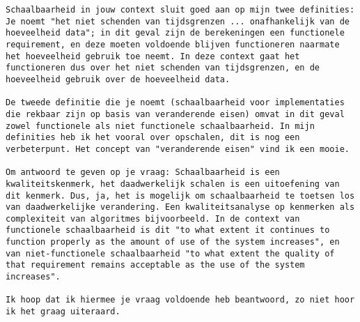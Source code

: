 \begin{verbatim}
Schaalbaarheid in jouw context sluit goed aan op mijn twee definities: Je noemt "het niet schenden van tijdsgrenzen ... onafhankelijk van de hoeveelheid data"; in dit geval zijn de berekeningen een functionele requirement, en deze moeten voldoende blijven functioneren naarmate het hoeveelheid gebruik toe neemt. In deze context gaat het functioneren dus over het niet schenden van tijdsgrenzen, en de hoeveelheid gebruik over de hoeveelheid data.

De tweede definitie die je noemt (schaalbaarheid voor implementaties die rekbaar zijn op basis van veranderende eisen) omvat in dit geval zowel functionele als niet functionele schaalbaarheid. In mijn definities heb ik het vooral over opschalen, dit is nog een verbeterpunt. Het concept van "veranderende eisen" vind ik een mooie.

Om antwoord te geven op je vraag: Schaalbaarheid is een kwaliteitskenmerk, het daadwerkelijk schalen is een uitoefening van dit kenmerk. Dus, ja, het is mogelijk om schaalbaarheid te toetsen los van daadwerkelijke verandering. Een kwaliteitsanalyse op kenmerken als complexiteit van algoritmes bijvoorbeeld. In de context van functionele schaalbaarheid is dit "to what extent it continues to function properly as the amount of use of the system increases", en van niet-functionele schaalbaarheid "to what extent the quality of that requirement remains acceptable as the use of the system increases".

Ik hoop dat ik hiermee je vraag voldoende heb beantwoord, zo niet hoor ik het graag uiteraard.
\end{verbatim}

